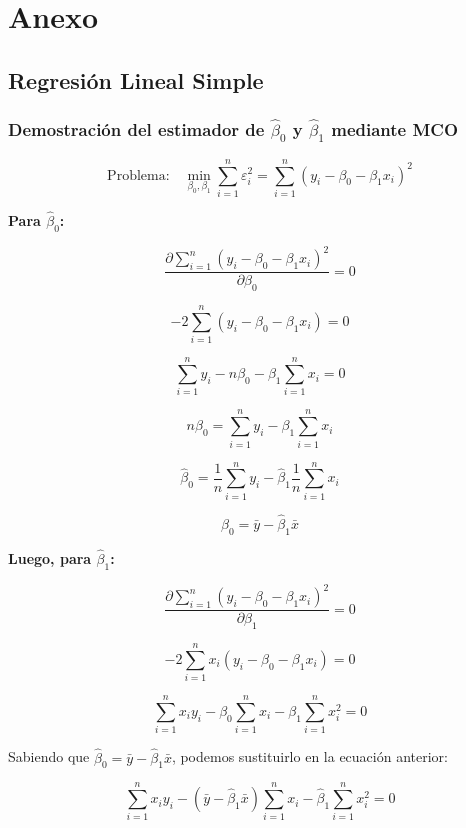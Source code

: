 \documentclass[
]{book}
\begin{document}
\chapter{Anexo}\label{anexo}

\section{Regresión Lineal Simple}\label{regresiuxf3n-lineal-simple-1}

\subsection{\texorpdfstring{Demostración del estimador de \(\hat{\beta}_0\) y \(\hat{\beta}_1\) mediante MCO}{Demostración del estimador de \textbackslash hat\{\textbackslash beta\}\_0 y \textbackslash hat\{\textbackslash beta\}\_1 mediante MCO}}\label{demostraciuxf3n-del-estimador-de-hatbeta_0-y-hatbeta_1-mediante-mco}

\[
\text{Problema:} \quad \min_{\beta_0, \beta_1} \sum_{i=1}^{n}\varepsilon_i^2 = \sum_{i=1}^{n} (y_i - \beta_0 - \beta_1 x_i)^2
\]

\textbf{Para \(\hat{\beta}_0\):}

\[
\frac{\partial \sum_{i=1}^{n} (y_i - \beta_0 - \beta_1 x_i)^2}{\partial \beta_0} = 0
\]

\[
-2\sum_{i=1}^{n} (y_i - \beta_0 - \beta_1 x_i) = 0
\]

\[
\sum_{i=1}^{n} y_i - n\beta_0 - \beta_1 \sum_{i=1}^{n} x_i = 0
\]

\[
n\beta_0 = \sum_{i=1}^{n} y_i - \beta_1 \sum_{i=1}^{n} x_i
\]

\[
\widehat{\beta}_0 = \frac{1}{n} \sum_{i=1}^{n} y_i - \hat{\beta}_1 \frac{1}{n} \sum_{i=1}^{n} x_i
\]

\[
\widehat{\beta}_0 = \bar{y} - \widehat{\beta}_1\bar{x}
\]

\textbf{Luego, para \(\hat{\beta}_1\):}

\[
\frac{\partial \sum_{i=1}^{n} (y_i - \beta_0 - \beta_1 x_i)^2}{\partial \beta_1} = 0
\]

\[
-2\sum_{i=1}^{n} x_i (y_i - \beta_0 - \beta_1 x_i) = 0
\]

\[
\sum_{i=1}^{n} x_i y_i - \beta_0 \sum_{i=1}^{n} x_i - \beta_1 \sum_{i=1}^{n} x_i^2 = 0
\]

Sabiendo que \(\hat{\beta}_0 = \bar{y} - \hat{\beta}_1\bar{x}\), podemos sustituirlo en la ecuación anterior:

\[
\sum_{i=1}^{n} x_i y_i - (\bar{y} - \hat{\beta}_1\bar{x}) \sum_{i=1}^{n} x_i - \hat{\beta}_1 \sum_{i=1}^{n} x_i^2 = 0
\]
\end{document}
